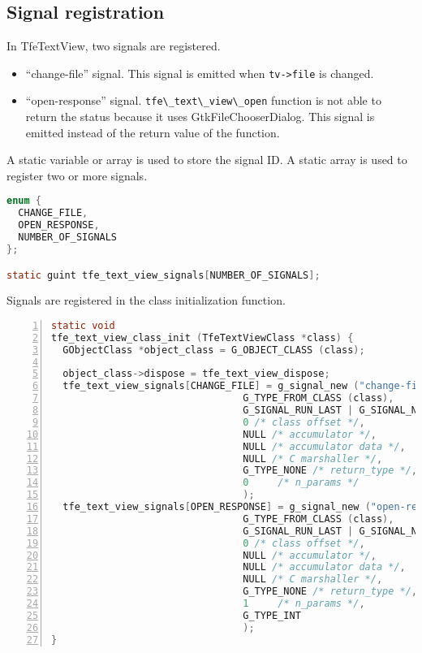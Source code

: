 \hypertarget{signal-registration}{%
\subsection{Signal registration}\label{signal-registration}}

In TfeTextView, two signals are registered.

\begin{itemize}
\tightlist
\item
  ``change-file'' signal. This signal is emitted when
  \passthrough{\lstinline!tv->file!} is changed.
\item
  ``open-response'' signal.
  \passthrough{\lstinline!tfe\_text\_view\_open!} function is not able
  to return the status because it uses GtkFileChooserDialog. This signal
  is emitted instead of the return value of the function.
\end{itemize}

A static variable or array is used to store the signal ID. A static
array is used to register two or more signals.

\begin{lstlisting}[language=C]
enum {
  CHANGE_FILE,
  OPEN_RESPONSE,
  NUMBER_OF_SIGNALS
};

static guint tfe_text_view_signals[NUMBER_OF_SIGNALS];
\end{lstlisting}

Signals are registered in the class initialization function.

\begin{lstlisting}[language=C, numbers=left]
static void
tfe_text_view_class_init (TfeTextViewClass *class) {
  GObjectClass *object_class = G_OBJECT_CLASS (class);

  object_class->dispose = tfe_text_view_dispose;
  tfe_text_view_signals[CHANGE_FILE] = g_signal_new ("change-file",
                                 G_TYPE_FROM_CLASS (class),
                                 G_SIGNAL_RUN_LAST | G_SIGNAL_NO_RECURSE | G_SIGNAL_NO_HOOKS,
                                 0 /* class offset */,
                                 NULL /* accumulator */,
                                 NULL /* accumulator data */,
                                 NULL /* C marshaller */,
                                 G_TYPE_NONE /* return_type */,
                                 0     /* n_params */
                                 );
  tfe_text_view_signals[OPEN_RESPONSE] = g_signal_new ("open-response",
                                 G_TYPE_FROM_CLASS (class),
                                 G_SIGNAL_RUN_LAST | G_SIGNAL_NO_RECURSE | G_SIGNAL_NO_HOOKS,
                                 0 /* class offset */,
                                 NULL /* accumulator */,
                                 NULL /* accumulator data */,
                                 NULL /* C marshaller */,
                                 G_TYPE_NONE /* return_type */,
                                 1     /* n_params */,
                                 G_TYPE_INT
                                 );
}
\end{lstlisting}


